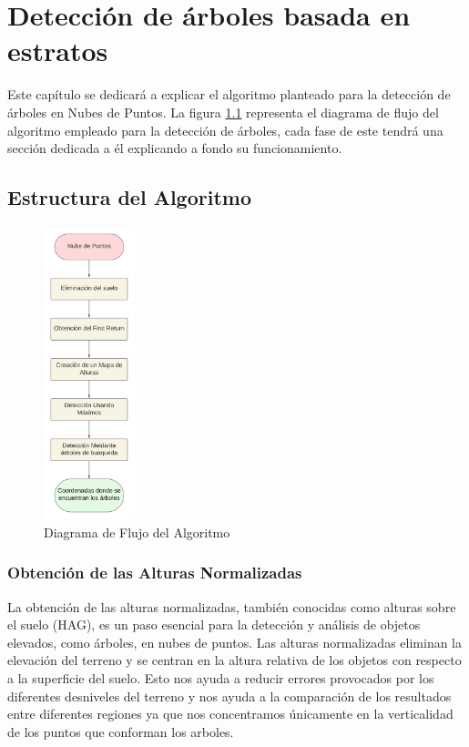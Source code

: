 \chapter{Detección de árboles basada en estratos}
\label{chap:Deteccion}
Este capítulo se dedicará a explicar el algoritmo planteado para la detección de árboles en Nubes de Puntos. La figura \ref{fig:diagFlujoAlgoritmo} representa el diagrama de flujo del algoritmo empleado para la detección de árboles, cada fase de este tendrá una sección dedicada a él explicando a fondo su funcionamiento.

\section{Estructura del Algoritmo}
\label{sec:EstrucuturaProp}

\begin{figure}[h]
\centering
\includegraphics[height=8.5cm]{imaxes/Diagrama_alg.png}
\caption{Diagrama de Flujo del Algoritmo}
\label{fig:diagFlujoAlgoritmo}
\end{figure}


\subsection{Obtención de las Alturas Normalizadas}
\label{chap:normalAlgo}

La obtención de las alturas normalizadas, también conocidas como alturas sobre el suelo (HAG), es un paso esencial para la detección y análisis de objetos elevados, como árboles, en nubes de puntos. Las alturas normalizadas eliminan la elevación del terreno y se centran en la altura relativa de los objetos con respecto a la superficie del suelo.
Esto nos ayuda a reducir errores provocados por los diferentes desniveles del terreno y nos ayuda a la comparación de los resultados entre diferentes regiones ya que nos concentramos únicamente en la verticalidad de los puntos que conforman los arboles.

